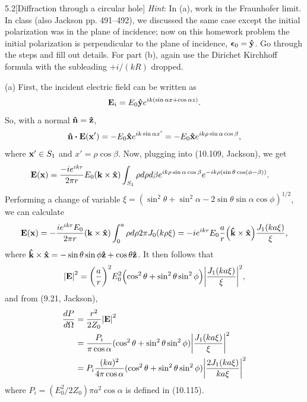 \documentclass[12pt]{article}
\begin{document}
\begin{problem}{5.2}[Diffraction through a circular hole]
\textit{Hint}: In (a), work in the Fraunhofer limit. In class (also Jackson pp.
491--492), we discussed the same case except the initial polarization was in the
plane of incidence; now on this homework problem the initial polarization is
perpendicular to the plane of incidence, $\bm\epsilon_0=\vb{\hat{y}}$. Go through the
steps and fill out details. For part (b), again use the Dirichet Kirchhoff
formula with the subleading $+i/(kR)$ dropped.
\begin{solution}
(a) First, the incident electric field can be written as
\begin{equation}
    \vb{E}_i=E_0\vb{\hat{y}} e^{ik(\sin\alpha x+\cos\alpha z)}. 
\end{equation}
So, with a normal $\vb{\hat{n}}=\vb{\hat{z}}$, 
\begin{equation}
    \nhat\vdot\vb{E}(\vb{x}')=-E_0\xhat e^{ik\sin\alpha x'}
    =-E_0\xhat e^{ik\rho\sin\alpha\cos\beta},
\end{equation}
where $\vb{x}'\in S_1$ and $x'=\rho\cos\beta$. Now, plugging into (10.109,
Jackson), we get
\begin{align}
    \vb{E}(\vb{x})
    &=\frac{-ie^{ikr}}{2\pi r}E_0(\vb{k}\times\vb{\hat{x}})
    \int_{S_1}\rho d\rho d\beta e^{ik\rho\sin\alpha\cos\beta}
    e^{-ik\rho(\sin\theta\cos(\phi-\beta))}.
\end{align}
Performing a change of variable
$\xi=(\sin^2\theta+\sin^2\alpha-2\sin\theta\sin\alpha\cos\phi)^{1/2}$, we can
calculate
\begin{equation}
    \vb{E}(\vb{x})
    =-\frac{ie^{ikr}E_0}{2\pi r}\qty(\vb{k}\times\vb{\hat{x}})
    \int_0^a\rho d\rho 2\pi J_0(k\rho\xi)
    =-ie^{ikr}E_0\frac{a}{r}\qty(\vb{\hat{k}}\times\vb{\hat{x}})\frac{J_1(ka\xi)}{\xi},
\end{equation}
where $\vb{\hat{k}}\times\vb{\hat{x}}=-\sin\theta\sin\phi\vb{\hat{z}}+\cos\theta\vb{\hat{z}}$. It
then follows that
\begin{equation}
    \abs{\vb{E}}^2=\qty(\frac{a}{r})^2E_0^2\qty(\cos^2\theta+\sin^2\theta\sin^2\phi)\abs{\frac{J_1(ka\xi)}{\xi}}^2,
\end{equation}
and from (9.21, Jackson), 
\begin{align}\label{p2a:dP}
    \frac{dP}{d\Omega}
    &=\frac{r^2}{2Z_0}\abs{\vb{E}}^2\notag\\
    &=\frac{P_i}{\pi\cos\alpha}(\cos^2\theta+\sin^2\theta\sin^2\phi)\abs{\frac{J_1(ka\xi)}{\xi}}^2\notag\\
    &=P_i\frac{(ka)^2}{4\pi\cos\alpha}(\cos^2\theta+\sin^2\theta\sin^2\phi)\abs{\frac{2J_1(ka\xi)}{ka\xi}}^2
\end{align}
where $P_i=(E_0^2/2Z_0)\pi a^2\cos\alpha$ is defined in (10.115).


\end{solution}
\end{problem}
\end{document}
